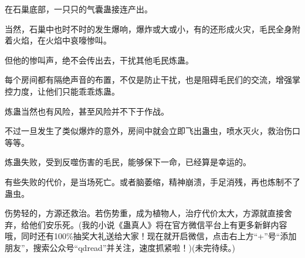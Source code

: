\begin{this_body}
在石巢底部，一只只的气囊蛊接连产出。

当然，石巢中也时不时的发生爆响，爆炸或大或小，有的还形成火灾，毛民全身附着火焰，在火焰中哀嚎惨叫。

但他的惨叫声，绝不会传出去，干扰其他毛民炼蛊。

每个房间都有隔绝声音的布置，不仅是防止干扰，也是阻碍毛民们的交流，增强掌控力度，让他们只能乖乖炼蛊。

炼蛊当然也有风险，甚至风险并不下于作战。

不过一旦发生了类似爆炸的意外，房间中就会立即飞出蛊虫，喷水灭火，救治伤口等等。

炼蛊失败，受到反噬伤害的毛民，能够保下一命，已经算是幸运的。

有些失败的代价，是当场死亡。或者脑萎缩，精神崩溃，手足消残，再也炼制不了蛊虫。

伤势轻的，方源还救治。若伤势重，成为植物人，治疗代价太大，方源就直接舍弃，给他们安乐死。(我的小说《蛊真人》将在官方微信平台上有更多新鲜内容哦，同时还有100\%抽奖大礼送给大家！现在就开启微信，点击右上方“+”号“添加朋友”，搜索公众号“qdread”并关注，速度抓紧啦！)(未完待续。)

\end{this_body}

